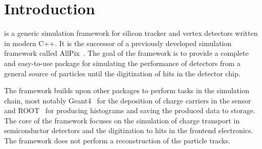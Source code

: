 \section{Introduction}
\label{sec:introduction}
\apsq is a generic simulation framework for silicon tracker and vertex detectors written in modern C++. It is the successor of a previously developed simulation framework called AllPix~\cite{ap1wiki,ap1git}. The goal of the \apsq framework is to provide a complete and easy-to-use package for simulating the performance of detectors from a general source of particles until the digitization of hits in the detector chip.

The framework builds upon other packages to perform tasks in the simulation chain, most notably Geant4~\cite{geant4} for the deposition of charge carriers in the sensor and ROOT~\cite{root} for producing histograms and saving the produced data to storage. The core of the framework focuses on the simulation of charge transport in semiconductor detectors and the digitization to hits in the frontend electronics. The framework does not perform a reconstruction of the particle tracks.

